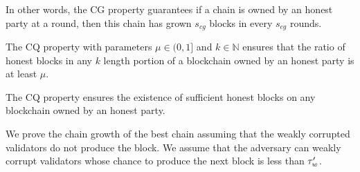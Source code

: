 In other words, the CG property guarantees if a chain is owned by an honest party at a round, then this chain has grown $ s_{cg}$ blocks in every $ s_{cg} $ rounds. 

\begin{definition}\label{def:cq}
	The CQ property with parameters $ \mu \in (0,1]  $ and $ k \in \mathbb{N} $ ensures that the ratio of honest blocks in any $ k $ length portion of a blockchain owned by an honest party is at least $ \mu $.
\end{definition} 

The CQ property ensures the existence of sufficient honest blocks on  any blockchain owned by an honest party.

We prove the chain growth of the best chain assuming that the weakly corrupted validators do not produce the block. We assume that the adversary can weakly corrupt validators whose chance to produce the next block is less than $ \tau_w' $.



